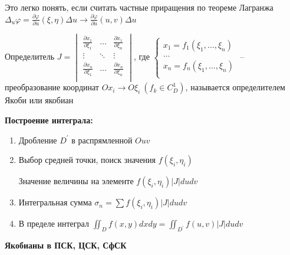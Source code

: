 \documentclass[12pt]{article}
\begin{document}
    Это легко понять, если считать частные приращения по теореме Лагранжа $\Delta_u \varphi = \frac{\partial \varphi}{\partial u}(\xi, \eta) \Delta u \rightarrow \frac{\partial \varphi}{\partial u}(u, v) \Delta u$

    \hypertarget{determinantJaсobi}{}

    \Def Определитель $J = \begin{vmatrix}
        \frac{\partial x_1}{\partial \xi_1} & \dots  & \frac{\partial x_1}{\partial \xi_n} \\
        \vdots & \ddots & \vdots \\
        \frac{\partial x_n}{\partial \xi_1} & \dots  & \frac{\partial x_n}{\partial \xi_n} \\
    \end{vmatrix}$, где $\begin{cases}
                             x_1 = f_1(\xi_1, \dots, \xi_n) \\
                             \dots \\
                             x_n = f_n(\xi_1, \dots, \xi_n) \\
    \end{cases}$ -- преобразование координат $Ox_i \to O\xi_i \ (f_k \in C^1_D)$, называется определителем Якоби или якобиан

    \vspace{5mm}

    \textbf{Построение интеграла:}
    \begin{enumerate}
        \item Дробление $D^\prime$ в распрямленной $Ouv$
        \item Выбор средней точки, поиск значения $f(\xi_i, \eta_i)$

        Значение величины на элементе $f(\xi_i, \eta_i) |J| du dv$
        \item Интегральная сумма $\sigma_n = \sum f(\xi_i, \eta_i) |J| du dv$
        \item В пределе интеграл $\iint_D f(x, y) dx dy = \iint_{D^\prime} f(u, v) |J| du dv$
    \end{enumerate}

    \vspace{5mm}

    \textbf{Якобианы в ПСК, ЦСК, СфСК}
\end{document}
